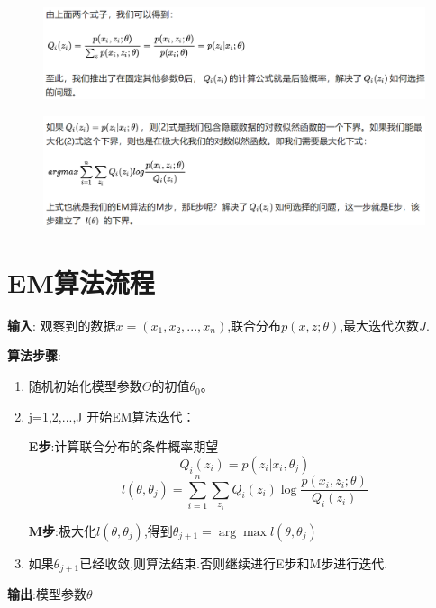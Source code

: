 \documentclass[11pt,a4paper,oneside]{book}
\begin{document}
\begin{figure}[H]
	\centering
	\includegraphics[width=\textwidth]{21.png}
\end{figure}
\begin{figure}[H]
	\centering
	\includegraphics[width=\textwidth]{22.png}
\end{figure}
\section{EM算法流程}
\textbf{输入}: 观察到的数据$ x=(x_1,x_2,...,x_n) $,联合分布$ p(x,z;\theta) $,最大迭代次数$ J $.

\textbf{算法步骤}:
\begin{enumerate}
	\item 随机初始化模型参数$ \Theta $的初值$ \theta_0 $。
	\item j=1,2,...,J 开始EM算法迭代：
	
	\textbf{E步}:计算联合分布的条件概率期望
	\begin{equation}
	Q_i(z_i)=p(z_i|x_i,\theta_j)
	\end{equation}
	\begin{equation}
	l(\theta ,\theta_j)=\sum_{i=1}^{n}\sum_{z_i}Q_i(z_i)\log\frac{p(x_i,z_i;\theta)}{Q_i(z_i)}
	\end{equation}

	\textbf{M步}:极大化$ l(\theta ,\theta_j) $,得到$ \theta_{j+1} =\arg\max l(\theta ,\theta_j)$
	
	\item 如果$ \theta_{j+1} $已经收敛,则算法结束.否则继续进行E步和M步进行迭代.
\end{enumerate}

\textbf{输出}:模型参数$ \theta $
\begin{lstlisting}[language=r]
	
\end{lstlisting}
\begin{lstlisting}[language=r]
	
\end{lstlisting}
\begin{lstlisting}[language=r]
	
\end{lstlisting}
\begin{lstlisting}[language=r]
	
\end{lstlisting}
\end{document}
